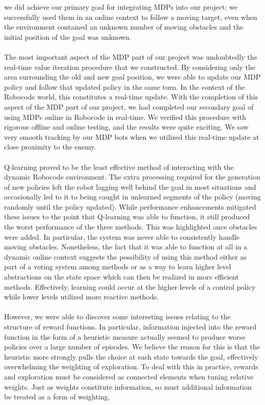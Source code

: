 \documentclass{aiaa-tc}%
\begin{document}
we did achieve our primary goal for integrating MDPs into our project: we successfully used them in an online context to follow a moving target, even when the environment contained an unknown number of moving obstacles and the initial position
of the goal was unknown. \\ \\
The most important aspect of the MDP part of our project was undoubtedly the real-time value iteration procedure that we constructed. By considering only the area surrounding the old and new goal position, we were able to update our MDP policy and follow
that updated policy in the same turn. In the context of the Robocode world, this constitutes a real-time update. With the completion of this aspect of the MDP part of our project, we had completed our secondary goal of using MDPs online in Robocode in real-time. We verified this
procedure with rigorous offline and online testing, and the results were quite exciting. We saw very smooth tracking by our MDP bots when we utilized this real-time update at close proximity to the enemy.\\ \\
Q-learning proved to be the least effective method of interacting
with the dynamic Robocode environment. The extra processing required for the generation
of new policies left the robot lagging well behind the goal in most
situations and occasionally led to it to being caught in unlearned
segments of the policy (moving randomly until the policy updated). While performance enhancements mitigated these issues to
the point that Q-learning was able to function, it
still produced the worst performance of the three
methods. This was highlighted once obstacles were
added. In particular, the system was never able to consistently handle
moving obstacles. Nonetheless, the fact that it was able to
function at all in a dynamic online context suggests the possibility of using this method either as part of a voting system among methods or as a way to learn higher level abstractions on the state space which can then be realized in more efficient methods. Effectively, learning could occur at the higher levels of a control policy while lower levels utilized more reactive methods. \\ \\
However, we were able to discover some interesting issues relating to the structure of reward functions. In particular, information injected into the reward function in the form of a heuristic measure actually seemed to produce worse policies over a large number of episodes. We believe the reason for this is that the heuristic more strongly pulls the choice at each state towards the goal, effectively overwhelming the weighting of exploration. To deal with this in practice, rewards and exploration must be considered as connected elements when tuning relative weights. Just as weights constitute information, so must additional information be treated as a form of weighting. \\ \\
\end{document}
